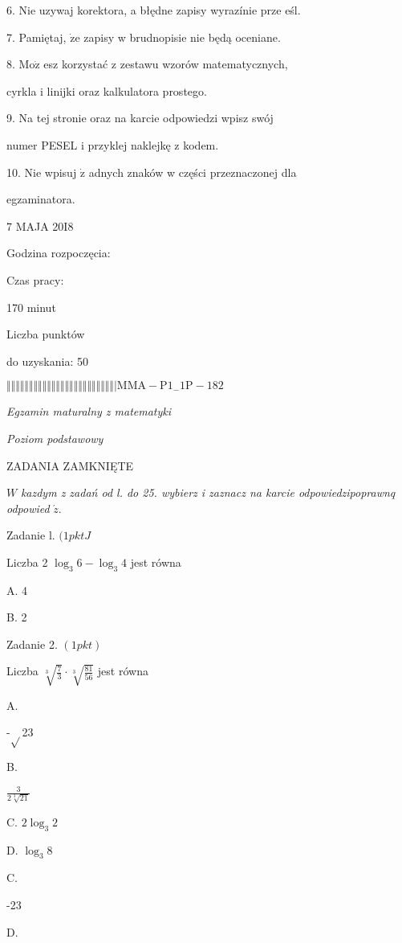 \documentclass[a4paper,12pt]{article}
\begin{document}
6. Nie uzywaj korektora, a błędne zapisy wyrazínie prze eśl.

7. Pamiętaj, $\dot{\mathrm{z}}\mathrm{e}$ zapisy w brudnopisie nie będą oceniane.

8. $\mathrm{M}\mathrm{o}\dot{\mathrm{z}}$ esz korzystać z zestawu wzorów matematycznych,

cyrkla i linijki oraz kalkulatora prostego.

9. Na tej stronie oraz na karcie odpowiedzi wpisz swój

numer PESEL i przyklej naklejkę z kodem.

10. Nie wpisuj $\dot{\mathrm{z}}$ adnych znaków w części przeznaczonej dla

egzaminatora.

7 MAJA 20I8

Godzina rozpoczęcia:

Czas pracy:

170 minut

Liczba punktów

do uzyskania: 50

$\Vert\Vert\Vert\Vert\Vert\Vert\Vert\Vert\Vert\Vert\Vert\Vert\Vert\Vert\Vert\Vert\Vert\Vert\Vert\Vert\Vert\Vert\Vert\Vert|  \mathrm{M}\mathrm{M}\mathrm{A}-\mathrm{P}1_{-}1\mathrm{P}-182$




{\it Egzamin maturalny z matematyki}

{\it Poziom podstawowy}

ZADANIA ZAMKNIĘTE

$W$ {\it kazdym z zadań od l. do 25. wybierz i zaznacz na karcie odpowiedzipoprawnq odpowied} $\acute{z}.$

Zadanie l. $(1pktJ$

Liczba 2 $\log_{3}6-\log_{3}4$ jest równa

A. 4

B. 2

Zadanie 2. $(1pkt)$

Liczba $\sqrt[3]{\frac{7}{3}}\cdot\sqrt[3]{\frac{81}{56}}$ jest równa

A.

-$\sqrt{}$23

B.

$\displaystyle \frac{3}{2\sqrt[3]{21}}$

C. $2\log_{3}2$

D. $\log_{3}8$

C.

-23

D.
\end{document}

